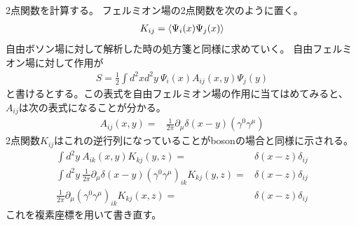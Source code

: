 \documentclass[11pt, dvipdfmx]{article}
\numberwithin{equation}{section}
\begin{document}
2点関数を計算する。
フェルミオン場の2点関数を次のように置く。
\begin{align}
    K_{i j}=\ev{\Psi_i(x)\Psi_j(x)}
\end{align}
自由ボソン場に対して解析した時の処方箋と同様に求めていく。
自由フェルミオン場に対して作用が
\begin{align}
    S=\frac{1}{2}\int d^2x d^2y \ \Psi_i(x) A_{i j}(x,y) \Psi_j(y)
\end{align}
と書けるとする。この表式を自由フェルミオン場の作用に当てはめてみると、$A_{ij}$は次の表式になることが分かる。
\begin{align}
    A_{i j}(x,y)=&\frac{1}{2\pi} \partial_\mu\delta(x-y) (\gamma^0\gamma^\mu) 
\end{align}
2点関数$K_{ij}$はこれの逆行列になっていることがbosonの場合と同様に示される。
\begin{align}
    \int d^2y \ A_{i k}(x,y) K_{k j}(y,z)=& \delta(x-z)\delta_{i j}\\
    \int d^2y \ \frac{1}{2\pi}\partial_\mu\delta(x-y) (\gamma^0\gamma^\mu)_{ik} K_{k j}(y,z)=& \delta(x-z)\delta_{i j}\\
    \frac{1}{2\pi}\partial_\mu (\gamma^0\gamma^\mu)_{ik} K_{k j}(x,z)=& \delta(x-z)\delta_{i j}\label{free fermion 2point}
\end{align}
これを複素座標を用いて書き直す。\\
\end{document}
